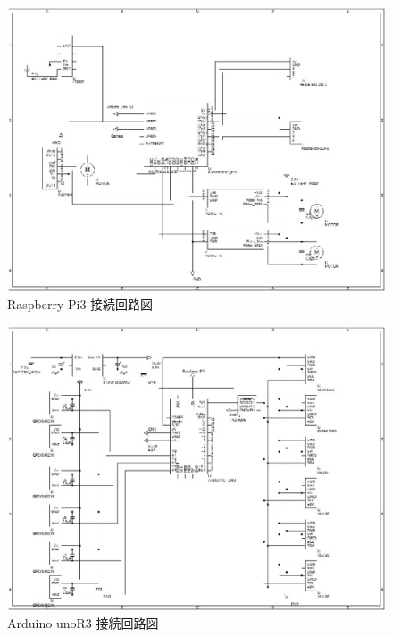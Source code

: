 \newpage
\begin{figure}[H]
 \centering
 \includegraphics[width=0.9\hsize]{../Circuit/picture/RCR_raspberryPi3.eps}
    \caption{Raspberry Pi3 接続回路図}
    \label{c_raspberry}
\end{figure}
\begin{figure}[H]
 \centering
 \includegraphics[width=0.9\hsize]{../Circuit/picture/RCR_arduino.eps}
    \caption{Arduino unoR3 接続回路図}
    \label{c_arduino}
\end{figure}

